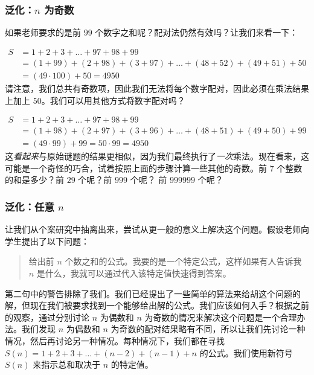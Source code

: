 \subsubsection*{泛化：$n$ 为奇数}

如果老师要求的是前 $99$ 个数字之和呢？配对法仍然有效吗？让我们来看一下：

\begin{align*}
    S &= 1 + 2 + 3 + \dots + 97 + 98 + 99 \\
    &= (1 + 99) + (2 + 98) + (3 + 97) + \dots + (48 + 52) + (49 + 51) + 50 \\
    &= (49 \cdot 100) + 50 = 4950
\end{align*}
请注意，我们总共有奇数项，因此我们无法将每个数字配对，因此必须在乘法结果上加上 $50$。我们可以用其他方式将数字配对吗？

\begin{align*}
    S &= 1 + 2 + 3 + \dots + 97 + 98 + 99 \\
    &= (1 + 98) + (2 + 97) + (3 + 96) + \dots + (48 + 51) + (49 + 50) + 99 \\
    &= (49 \cdot 99) + 99 = 50 \cdot 99 = 4950
\end{align*}
这\emph{看起来}与原始谜题的结果更相似，因为我们最终执行了\emph{一次}乘法。现在看来，这可能是一个奇怪的巧合，试着按照上面的步骤计算一些其他的奇数。前 $7$ 个整数的和是多少？前 $29$ 个呢？前 $999$ 个呢？ 前 $999999$ 个呢？

\subsubsection*{泛化：任意 $n$}

让我们从个案研究中抽离出来，尝试从更一般的意义上解决这个问题。假设老师向学生提出了以下问题：

\begin{quote}
    给出前 $n$ 个数之和的公式。我要的是一个特定公式，这样如果有人告诉我 $n$ 是什么，我就可以通过代入该特定值快速得到答案。
\end{quote}

第二句中的警告排除了我们。我们已经提出了一些简单的算法来给胡这个问题的解，但现在我们被要求找到一个能够给出解的公式。我们应该如何入手？根据之前的观察，通过分别讨论 $n$ 为偶数和 $n$ 为奇数的情况来解决这个问题是一个合理办法。我们发现 $n$ 为偶数和 $n$ 为奇数的配对结果略有不同，所以让我们先讨论一种情况，然后再讨论另一种情况。每种情况下，我们都在寻找 $S(n) = 1 + 2 + 3 + \dots + (n - 2) + (n - 1) + n$ 的公式。我们使用新符号 $S(n)$ 来指示总和取决于 $n$ 的特定值。

